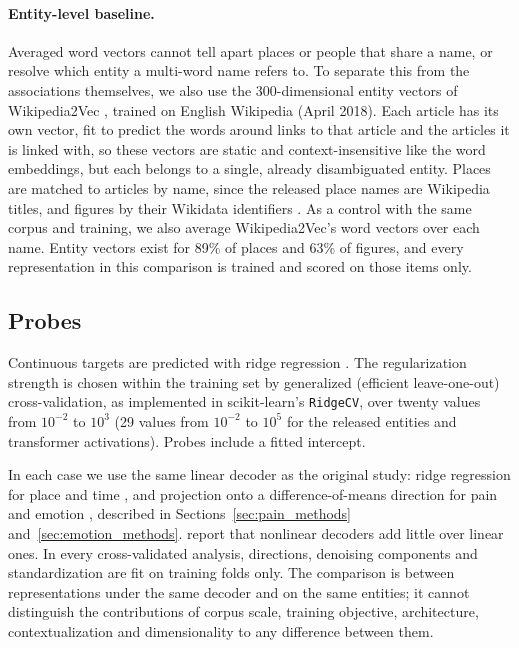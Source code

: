 \documentclass[11pt]{article}
\begin{document}
\paragraph{Entity-level baseline.} Averaged word vectors cannot tell apart places or people that
share a name, or resolve which entity a multi-word name refers to. To separate this from the
associations themselves, we also use the 300-dimensional entity vectors of Wikipedia2Vec
\citep{yamada2020wikipedia2vec}, trained on English Wikipedia (April 2018). Each article has its
own vector, fit to predict the words around links to that article and the articles it is linked
with, so these vectors are static and context-insensitive like the word embeddings, but each
belongs to a single, already disambiguated entity. Places are matched to articles by name, since
the released place names are Wikipedia titles, and figures by their Wikidata identifiers
\citep{vrandecic2014wikidata}. As a control with the same corpus and training, we also average
Wikipedia2Vec's word vectors over each name. Entity vectors exist for 89\% of places and 63\%
of figures, and every representation in this comparison is trained and scored on those items
only.

\subsection{Probes}

Continuous targets are predicted with ridge regression \citep{hoerl1970ridge}. The regularization strength is chosen within the training set by generalized (efficient leave-one-out) cross-validation, as implemented in scikit-learn's \texttt{RidgeCV}, over twenty values from $10^{-2}$ to $10^{3}$ (29 values from $10^{-2}$ to $10^{5}$ for the released entities and transformer activations). Probes include a fitted intercept.

In each case we use the same linear decoder as the original study: ridge regression for place and time \citep{gurnee2024language}, and projection onto a difference-of-means direction for pain and emotion \citep{tagliabue2026pain, sofroniew2026emotion}, described in
Sections~\ref{sec:pain_methods} and~\ref{sec:emotion_methods}. \citet{gurnee2024language} report that nonlinear decoders add little over linear ones. In every cross-validated analysis, directions, denoising components and standardization are fit on training folds only. The comparison is between representations under the same decoder and on the same entities; it cannot distinguish the contributions of corpus scale, training objective, architecture, contextualization and dimensionality to any difference between them.
\end{document}
